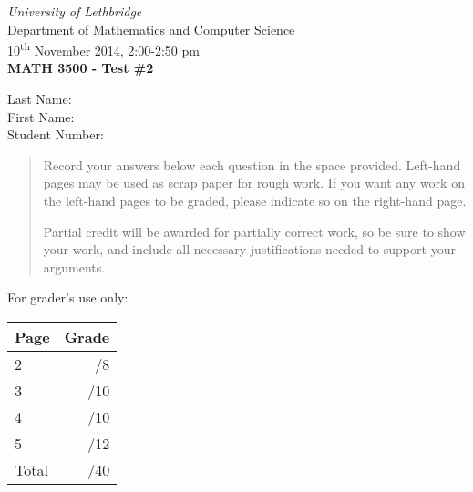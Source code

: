 \documentclass[12pt]{article}
\newcommand{\skipline}{\vspace{12pt}}
\begin{document}
\author{Instructor: Sean Fitzpatrick}
\thispagestyle{plain}
\begin{center}
\emph{University of Lethbridge}\\
Department of Mathematics and Computer Science\\
10\textsuperscript{th} November 2014, 2:00-2:50 pm\\
{\bf MATH 3500 - Test \#2}\\
\end{center}
\skipline \skipline \skipline \noindent \skipline
Last Name:\underline{\hspace{350pt}}\\
\skipline
First Name:\underline{\hspace{348pt}}\\
\skipline
Student Number:\underline{\hspace{322pt}}\\
\skipline

\vspace{0.5in}


\begin{quote}

 
 {Record your answers below each question in the space provided.    Left-hand pages may be used as scrap paper for rough work.  If you want any work on the left-hand pages to be graded, please indicate so on the right-hand page.
 
 \bigskip
 
Partial credit will be awarded for partially correct work, so be sure to show your work, and include all necessary justifications needed to support your arguments. }

\end{quote}


\vspace{0.5in}

For grader's use only:

\begin{table}[hbt]
\begin{center}
\begin{tabular}{|l|r|} \hline
Page&Grade\\
\hline \hline
\cline{1-2} 2 & \enspace\enspace\enspace\enspace\enspace\enspace/8\\
\cline{1-2} 3 & \enspace\enspace\enspace\enspace\enspace\enspace/10\\
\cline{1-2} 4 & \enspace\enspace\enspace\enspace\enspace\enspace/10\\
\cline{1-2} 5 & \enspace\enspace\enspace\enspace\enspace\enspace/12\\
\cline{1-2} Total & \enspace\enspace\enspace\enspace\enspace\enspace/40\\
\hline
\end{tabular}

\skipline

\skipline

\skipline

\end{center}
\end{table}
\newpage
\end{document}
